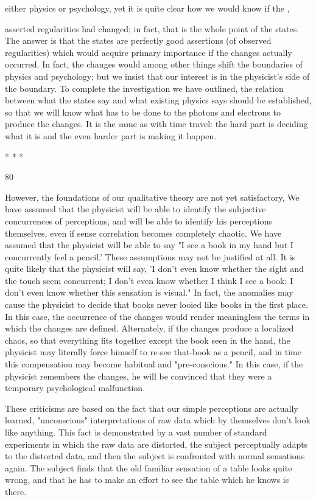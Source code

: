 \documentclass[10pt,twoside]{memoir}
\begin{document}
\begin{enumerate}
{{{{{{{{{{{{{{{{either physics or psychology, yet it is quite clear how we would know if the , 


asserted regularities had changed; in fact, that is the whole point of the 
states. The answer is that the states are perfectly good assertions (of 
observed regularities) which would acquire primary importance if the 
changes actually occurred. In fact, the changes would among other things 
shift the boundaries of physics and psychology; but we insist that our 
interest is in the physicist's side of the boundary. To complete the 
investigation we have outlined, the relation between what the states say and 
what existing physics says should be established, so that we will know what 
has to be done to the photons and electrons to produce the changes. It is the 
same as with time travel: the hard part is deciding what it is and the even 
harder part is making it happen. 


* * * 


80 


However, the foundations of our qualitative theory are not yet 
satisfactory, We have assumed that the physicist will be able to identify the 
subjective concurrences of perceptions, and will be able to identify his 
perceptions themselves, even if sense correlation becomes completely 
chaotic. We have assumed that the physicist will be able to say "I see a book 
in my hand but I concurrently feel a pencil.' These assumptions may not be 
justified at all. It is quite likely that the physicist will say, 'I don't even 
know whether the sight and the touch seem concurrent; I don't even know 
whether I think I see a book; I don't even know whether this sensation is 
visual." In fact, the anomalies may cause the physicist to decide that books 
never looied like books in the first place. In this case, the occurrence of the 
changes would render meaningless the terms in which the changes are 
defined. Alternately, if the changes produce a localized chaos, so that 
everything fits together except the book seen in the hand, the physicist may 
literally force himself to re-see that-book as a pencil, and in time this 
compensation may become habitual and "pre-conscious." In this case, if the 
physicist remembers the changes, he will be convinced that they were a 
temporary psychological malfunction. 

These criticisms are based on the fact that our simple perceptions are 
actually learned, "unconscious" interpretations of raw data which by 
themselves don't look like anything. This fact is demonstrated by a vast 
number of standard experiments in which the raw data are distorted, the 
subject perceptually adapts to the distorted data, and then the subject is 
confronted with normal sensations again. The subject finds that the old 
familiar sensation of a table looks quite wrong, and that he has to make an 
effort to see the table which he knows is there. 

}}}}}}}}}}}}}}}}
\end{enumerate}
\end{document}
